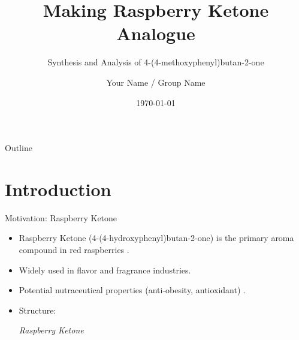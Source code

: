 \documentclass[10pt]{beamer}
\title{Making Raspberry Ketone Analogue}
\subtitle{Synthesis and Analysis of 4-(4-methoxyphenyl)butan-2-one}
\author{Your Name / Group Name}
\institute{Department of Chemistry \\ Course: CH3204 Organic Synthesis}
\date{\today}
\begin{document}
\begin{frame}[plain] %
    \titlepage
\end{frame}

\begin{frame}{Outline}
    \tableofcontents
\end{frame}

\section{Introduction}

\begin{frame}{Motivation: Raspberry Ketone}
    \begin{itemize}
        \item Raspberry Ketone (4-(4-hydroxyphenyl)butan-2-one) is the primary aroma compound in red raspberries \cite{RaspberryKetoneWiki}.
        \item Widely used in flavor and fragrance industries.
        \item Potential nutraceutical properties (anti-obesity, antioxidant) \cite{PharmacologicalExplorationRK}.
        \item Structure:
            \begin{center}
                \vspace{0.5em} %
                \textit{Raspberry Ketone} %
            \end{center}
    \end{itemize}
\end{frame}
\end{document}
